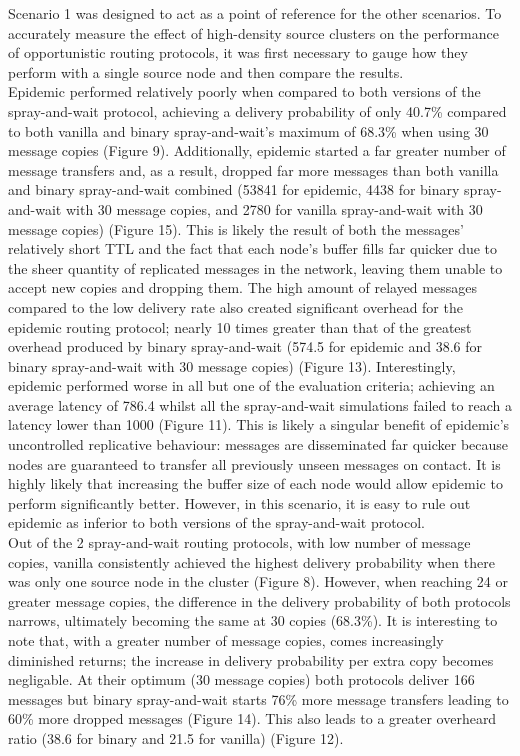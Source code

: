 \documentclass{article}
\begin{document}
\newpage

\noindent Scenario 1 was designed to act as a point of reference for the other scenarios. To accurately measure the effect of high-density source clusters on the performance of opportunistic routing protocols, it was first necessary to gauge how they perform with a single source node and then compare the results.\\
\newline Epidemic performed relatively poorly when compared to both versions of the spray-and-wait protocol, achieving a delivery probability of only 40.7\% compared to both vanilla and binary spray-and-wait's maximum of 68.3\% when using 30 message copies (Figure 9). Additionally, epidemic started a far greater number of message transfers and, as a result, dropped far more messages than both vanilla and binary spray-and-wait combined (53841 for epidemic, 4438 for binary spray-and-wait with 30 message copies, and 2780 for vanilla spray-and-wait with 30 message copies) (Figure 15). This is likely the result of both the messages' relatively short TTL and the fact that each node's buffer fills far quicker due to the sheer quantity of replicated messages in the network, leaving them unable to accept new copies and dropping them. The high amount of relayed messages compared to the low delivery rate also created significant overhead for the epidemic routing protocol; nearly 10 times greater than that of the greatest overhead produced by binary spray-and-wait (574.5 for epidemic and 38.6 for binary spray-and-wait with 30 message copies) (Figure 13). Interestingly, epidemic performed worse in all but one of the evaluation criteria; achieving an average latency of 786.4 whilst all the spray-and-wait simulations failed to reach a latency lower than 1000 (Figure 11). This is likely a singular benefit of epidemic's uncontrolled replicative behaviour: messages are disseminated far quicker because nodes are guaranteed to transfer all previously unseen messages on contact. It is highly likely that increasing the buffer size of each node would allow epidemic to perform significantly better. However, in this scenario, it is easy to rule out epidemic as inferior to both versions of the spray-and-wait protocol.\\
\newline Out of the 2 spray-and-wait routing protocols, with low number of message copies, vanilla consistently achieved the highest delivery probability when there was only one source node in the cluster (Figure 8). However, when reaching 24 or greater message copies, the difference in the delivery probability of both protocols narrows, ultimately becoming the same at 30 copies (68.3\%). It is interesting to note that, with a greater number of message copies, comes increasingly diminished returns; the increase in delivery probability per extra copy becomes negligable. At their optimum (30 message copies) both protocols deliver 166 messages but binary spray-and-wait starts 76\% more message transfers leading to 60\% more dropped messages (Figure 14). This also leads to a greater overheard ratio (38.6 for binary and 21.5 for vanilla) (Figure 12).\\
\end{document}
